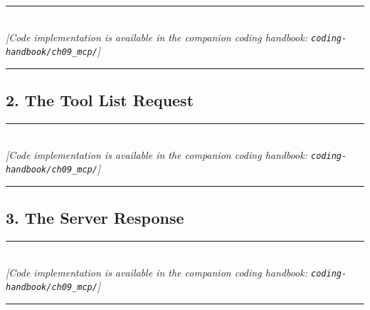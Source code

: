 \begin{center}
\noindent\rule{0.6\textwidth}{0.4pt} \\
\vspace{0.3em}
\textit{[Code implementation is available in the companion coding handbook: \texttt{coding-handbook/ch09\_mcp/}]} \\
\noindent\rule{0.6\textwidth}{0.4pt}
\end{center}


\subsection{2. The Tool List Request}

\begin{center}
\noindent\rule{0.6\textwidth}{0.4pt} \\
\vspace{0.3em}
\textit{[Code implementation is available in the companion coding handbook: \texttt{coding-handbook/ch09\_mcp/}]} \\
\noindent\rule{0.6\textwidth}{0.4pt}
\end{center}


\subsection{3. The Server Response}

\begin{center}
\noindent\rule{0.6\textwidth}{0.4pt} \\
\vspace{0.3em}
\textit{[Code implementation is available in the companion coding handbook: \texttt{coding-handbook/ch09\_mcp/}]} \\
\noindent\rule{0.6\textwidth}{0.4pt}
\end{center}

